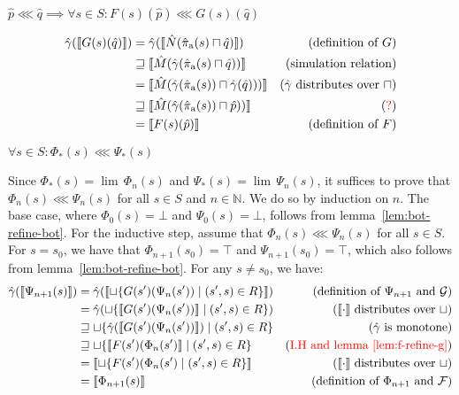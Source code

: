 \begin{lemma} \label{lem:f-refine-g}
$\hat p \lll \hat q \implies \forall s \in S : F(s)(\hat p) \lll G(s)(\hat q)$
\end{lemma}
%
\begin{align*}
\hat{\gamma}(\llbracket G(s)(\hat q) \rrbracket)
  & =         \hat{\gamma}(\llbracket \hat N(\operatorname{\hat{\pi}_{\textrm{a}}}(s) \sqcap \hat q) \rrbracket)           & (\textrm{definition of } G) \\
  & \sqsupseteq \llbracket \hat M(\hat{\gamma}(\operatorname{\hat{\pi}_{\textrm{a}}}(s) \sqcap \hat q)) \rrbracket           & (\textrm{simulation relation}) \\
  & =         \llbracket \hat M(\hat{\gamma}(\operatorname{\hat{\pi}_{\textrm{a}}}(s)) \sqcap \hat{\gamma}(\hat q))) \rrbracket & (\hat{\gamma} \textrm{ distributes over } \sqcap) \\
  & \sqsupseteq \llbracket \hat M(\hat{\gamma}(\operatorname{\hat{\pi}_{\textrm{a}}}(s)) \sqcap \hat p)) \rrbracket          & (\textrm{\textcolor{red}{?}}) \\
  & =         \llbracket F(s)(\hat p) \rrbracket                                            & (\textrm{definition of } F)
\end{align*}


\begin{lemma} \label{lem:phi-refine-psi}
$\forall s \in S : \Phi_{*}(s) \lll \Psi_{*}(s)$
\end{lemma}

Since $\Phi_{*}(s) = \lim \, \Phi_{n}(s)$ and $\Psi_{*}(s) = \lim \, \Psi_{n}(s)$, it suffices to prove that $\Phi_{n}(s) \lll \Psi_{n}(s)$ for all $s \in S$ and $n \in \mathbb{N}$. We do so by induction on $n$. The base case, where $\Phi_{0}(s) = \bot$ and $\Psi_{0}(s) = \bot$, follows from lemma~\ref{lem:bot-refine-bot}. For the inductive step, assume that $\Phi_{n}(s) \lll \Psi_{n}(s)$ for all $s \in S$. For $s = s_{0}$, we have that $\Phi_{n+1}(s_{0}) = \top$ and $\Psi_{n+1}(s_{0}) = \top$, which also follows from lemma~\ref{lem:bot-refine-bot}. For any $s \neq s_{0}$, we have:
%
\begin{align*}
\hat{\gamma}(\llbracket \Psi_{n+1}(s) \rrbracket)
  & =         \hat{\gamma}(\llbracket \sqcup \{ G(s')(\Psi_{n}(s')) \mid (s',s) \in R \} \rrbracket) & (\textrm{definition of } \Psi_{n+1} \textrm { and } \mathcal{G}) \\
  & =         \hat{\gamma}(\sqcup \{ \llbracket G(s')(\Psi_{n}(s')) \rrbracket \mid (s',s) \in R \}) & (\llbracket \cdot \rrbracket \textrm{ distributes over } \sqcup) \\
  & \sqsupseteq \sqcup \{ \hat{\gamma}(\llbracket G(s')(\Psi_{n}(s')) \rrbracket) \mid (s',s) \in R \} & (\hat{\gamma} \textrm{ is monotone}) \\
  & \sqsupseteq \sqcup \{ \llbracket F(s')(\Phi_{n}(s') \rrbracket \mid (s',s) \in R \}           & (\textrm{\textcolor{red}{I.H and lemma~\ref{lem:f-refine-g}}}) \\
  & =         \llbracket \sqcup \{ F(s')(\Phi_{n}(s') \mid (s',s) \in R \} \rrbracket           & (\llbracket \cdot \rrbracket \textrm{ distributes over } \sqcup) \\
  & =         \llbracket \Phi_{n+1}(s) \rrbracket                                              & (\textrm{definition of } \Phi_{n+1} \textrm{ and } \mathcal{F})
\end{align*}
\\

